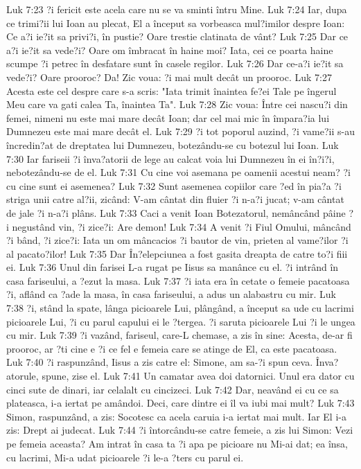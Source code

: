 Luk 7:23  ?i fericit este acela care nu se va sminti întru Mine.
Luk 7:24  Iar, dupa ce trimi?ii lui Ioan au plecat, El a început sa vorbeasca mul?imilor despre Ioan: Ce a?i ie?it sa privi?i, în pustie? Oare trestie clatinata de vânt?
Luk 7:25  Dar ce a?i ie?it sa vede?i? Oare om îmbracat în haine moi? Iata, cei ce poarta haine scumpe ?i petrec în desfatare sunt în casele regilor.
Luk 7:26  Dar ce-a?i ie?it sa vede?i? Oare prooroc? Da! Zic voua: ?i mai mult decât un prooroc.
Luk 7:27  Acesta este cel despre care s-a scris: "Iata trimit înaintea fe?ei Tale pe îngerul Meu care va gati calea Ta, înaintea Ta".
Luk 7:28  Zic voua: Între cei nascu?i din femei, nimeni nu este mai mare decât Ioan; dar cel mai mic în împara?ia lui Dumnezeu este mai mare decât el.
Luk 7:29  ?i tot poporul auzind, ?i vame?ii s-au încredin?at de dreptatea lui Dumnezeu, botezându-se cu botezul lui Ioan.
Luk 7:30  Iar fariseii ?i înva?atorii de lege au calcat voia lui Dumnezeu în ei în?i?i, nebotezându-se de el.
Luk 7:31  Cu cine voi asemana pe oamenii acestui neam? ?i cu cine sunt ei asemenea?
Luk 7:32  Sunt asemenea copiilor care ?ed în pia?a ?i striga unii catre al?ii, zicând: V-am cântat din fluier ?i n-a?i jucat; v-am cântat de jale ?i n-a?i plâns.
Luk 7:33  Caci a venit Ioan Botezatorul, nemâncând pâine ?i negustând vin, ?i zice?i: Are demon!
Luk 7:34  A venit ?i Fiul Omului, mâncând ?i bând, ?i zice?i: Iata un om mâncacios ?i bautor de vin, prieten al vame?ilor ?i al pacato?ilor!
Luk 7:35  Dar În?elepciunea a fost gasita dreapta de catre to?i fiii ei.
Luk 7:36  Unul din farisei L-a rugat pe Iisus sa manânce cu el. ?i intrând în casa fariseului, a ?ezut la masa.
Luk 7:37  ?i iata era în cetate o femeie pacatoasa ?i, aflând ca ?ade la masa, în casa fariseului, a adus un alabastru cu mir.
Luk 7:38  ?i, stând la spate, lânga picioarele Lui, plângând, a început sa ude cu lacrimi picioarele Lui, ?i cu parul capului ei le ?tergea. ?i saruta picioarele Lui ?i le ungea cu mir.
Luk 7:39  ?i vazând, fariseul, care-L chemase, a zis în sine: Acesta, de-ar fi prooroc, ar ?ti cine e ?i ce fel e femeia care se atinge de El, ca este pacatoasa.
Luk 7:40  ?i raspunzând, Iisus a zis catre el: Simone, am sa-?i spun ceva. Înva?atorule, spune, zise el.
Luk 7:41  Un camatar avea doi datornici. Unul era dator cu cinci sute de dinari, iar celalalt cu cincizeci.
Luk 7:42  Dar, neavând ei cu ce sa plateasca, i-a iertat pe amândoi. Deci, care dintre ei îl va iubi mai mult?
Luk 7:43  Simon, raspunzând, a zis: Socotesc ca acela caruia i-a iertat mai mult. Iar El i-a zis: Drept ai judecat.
Luk 7:44  ?i întorcându-se catre femeie, a zis lui Simon: Vezi pe femeia aceasta? Am intrat în casa ta ?i apa pe picioare nu Mi-ai dat; ea însa, cu lacrimi, Mi-a udat picioarele ?i le-a ?ters cu parul ei.
